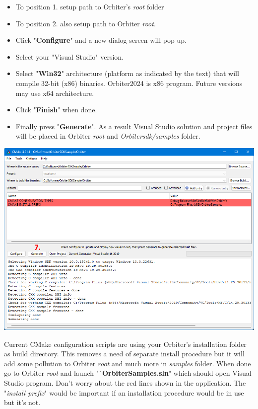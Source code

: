 \documentclass[a4paper]{article}
\begin{document}
\begin{itemize}
\item To position 1. setup path to Orbiter's \textit{root} folder
\item To position 2. also setup path to Orbiter \textit{root}.
\item Click "\textbf{Configure}" and a new dialog screen will pop-up.
\item Select your "Visual Studio" version.
\item Select "\textbf{Win32}" architecture (platform as indicated by the text) that will compile 32-bit (x86) binaries. Orbiter2024 is x86 program. Future versions may use x64 architecture.
\item Click "\textbf{Finish}" when done.
\item Finally press "\textbf{Generate}". As a result Visual Studio solution and project files will be placed in Orbiter \textit{root} and \textit{Orbitersdk/samples} folder.
\end{itemize}

\vspace{1cm}

\begin{center}
\includegraphics[width=1.0\linewidth]{assets/vsgen2.png}
\end{center}

\vspace{1cm}

Current CMake configuration scripts are using your Orbiter's installation folder as build directory. This removes a need of separate install procedure but it will add some pollution to Orbiter \textit{root} and much more in \textit{samples} folder. When done go to Orbiter \textit{root} and launch "`\textbf{OrbiterSamples.sln}" which should open Visual Studio program. Don't worry about the red lines shown in the application. The "\textit{install prefix}" would be important if an installation procedure would be in use but it's not.
\end{document}
